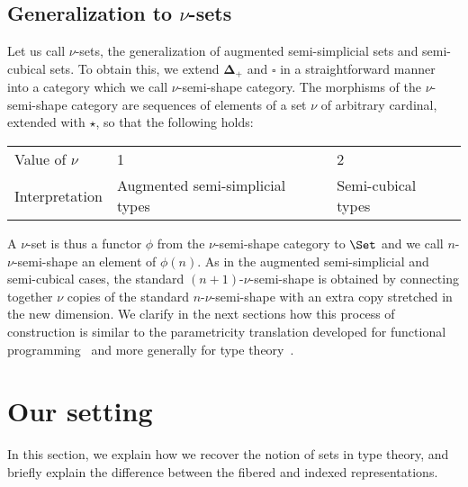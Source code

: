 \documentclass[10pt]{art.cls/art}
\newcommand{\DeltaPlus}{\ensuremath{\boldsymbol{\Delta}_+}}
\newcommand{\Cube}{\ensuremath{\boldsymbol{\square}}}
\newcommand{\kstar}{{\star}}
\def\graymidrule{\arrayrulecolor{gray30}\midrule\arrayrulecolor{gray65}}
\begin{document}
\subsection{Generalization to \texorpdfstring{$\nu$}{ν}-sets}
Let us call $\nu$-sets, the generalization of augmented semi-simplicial sets and semi-cubical sets. To obtain this, we extend $\DeltaPlus$ and $\Cube$ in a straightforward manner into a category which we call $\nu$-semi-shape category. The morphisms of the $\nu$-semi-shape category are sequences of elements of a set $\nu$ of arbitrary cardinal, extended with $\kstar$, so that the following holds:

\begin{table}[H]
  \centering
  \begin{tabularx}{0.95\linewidth}{X|X|X}
    \toprule
    Value of $\nu$ & 1                               & 2                  \\
    \graymidrule
    Interpretation & Augmented semi-simplicial types & Semi-cubical types \\
    \bottomrule
  \end{tabularx}
\end{table}

A $\nu$-set is thus a functor $\phi$ from the $\nu$-semi-shape category to $\Set$ and we call $n$-$\nu$-semi-shape an element of $\phi(n)$. As in the augmented semi-simplicial and semi-cubical cases, the standard $(n+1)$-$\nu$-semi-shape is obtained by connecting together $\nu$ copies of the standard $n$-$\nu$-semi-shape with an extra copy stretched in the new dimension. We clarify in the next sections how this process of construction is similar to the parametricity translation developed for functional programming~\cite{reynolds72} and more generally for type theory~\cite{bernardy10, bernardy11, atkey14, bernardy15}.

\section{Our setting}
In this section, we explain how we recover the notion of sets in type theory, and briefly explain the difference between the fibered and indexed representations.
\end{document}
